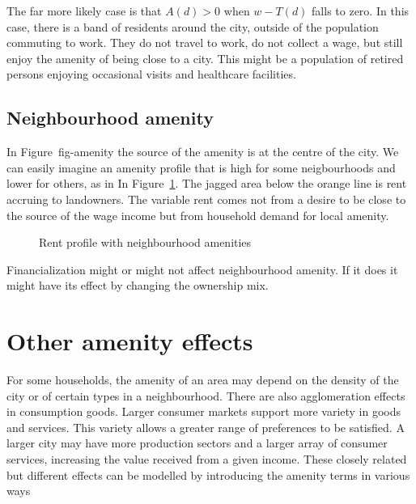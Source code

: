 The far more likely case is that $A(d) > 0$ when $w-T(d)$ falls to zero. In this case, there is a band of residents around the city, outside of the population commuting to work. They do not travel to work, do not collect a wage, but still enjoy the amenity of being close to a city. This might be a population of retired persons enjoying occasional visits and healthcare facilities.



\subsection{Neighbourhood amenity}
In Figure~{fig-amenity} the source of the amenity is at the centre of the city. We can easily imagine an amenity profile that is high for some neigbourhoods and lower for others, as in  In Figure~\ref{fig-amenity2}. The jagged area below the orange line is rent accruing to landowners. The variable rent comes not from a desire to be close to the source of the wage income but from household demand for local amenity.  
\begin{figure}[tb]
\begin{center}

\end{center}
\caption{Rent profile with neighbourhood amenities}
\label{fig-amenity2}
\end{figure}
Financialization might or might not affect neighbourhood amenity. If it does it might have its effect by changing the ownership mix.

\section{Other amenity effects}
For some households, the amenity of an area may depend on the density of the city or of certain types in a neighbourhood. %
There are also agglomeration effects in consumption goods. Larger consumer markets support more variety in goods and services. This variety allows a greater range of preferences to be satisfied. A larger city may have more production sectors and a larger array of consumer services, increasing the value received from a given income.  These closely related but different effects can be modelled by introducing the amenity terms in various ways 



